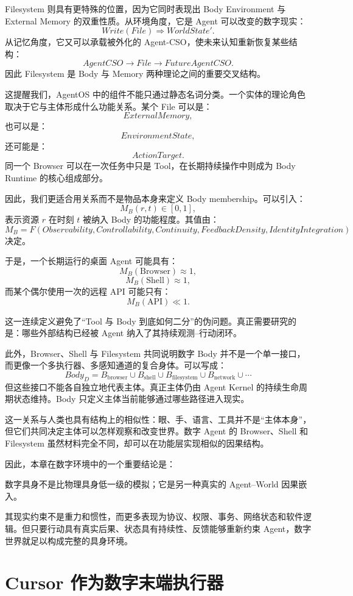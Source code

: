 Filesystem 则具有更特殊的位置，因为它同时表现出 Body Environment 与 External Memory 的双重性质。从环境角度，它是 Agent 可以改变的数字现实：
\[
Write(File)
\Rightarrow
WorldState'.
\]
从记忆角度，它又可以承载被外化的 Agent-CSO，使未来认知重新恢复某些结构：
\[
AgentCSO
\rightarrow
File
\rightarrow
FutureAgentCSO.
\]
因此 Filesystem 是 Body 与 Memory 两种理论之间的重要交叉结构。

这提醒我们，AgentOS 中的组件不能只通过静态名词分类。一个实体的理论角色取决于它与主体形成什么功能关系。某个 File 可以是：
\[
ExternalMemory,
\]
也可以是：
\[
EnvironmentState,
\]
还可能是：
\[
ActionTarget.
\]
同一个 Browser 可以在一次任务中只是 Tool，在长期持续操作中则成为 Body Runtime 的核心组成部分。

因此，我们更适合用关系而不是物品本身来定义 Body membership。可以引入：
\[
M_B(r,t)
\in
[0,1],
\]
表示资源 $r$ 在时刻 $t$ 被纳入 Body 的功能程度。其值由：
\[
M_B
=
F(
Observability,
Controllability,
Continuity,
FeedbackDensity,
IdentityIntegration
)
\]
决定。

于是，一个长期运行的桌面 Agent 可能具有：
\[
M_B(\mathrm{Browser})\approx1,
\]
\[
M_B(\mathrm{Shell})\approx1,
\]
而某个偶尔使用一次的远程 API 可能只有：
\[
M_B(\mathrm{API})\ll1.
\]

这一连续定义避免了“Tool 与 Body 到底如何二分”的伪问题。真正需要研究的是：哪些外部结构已经被 Agent 纳入了其持续观测--行动闭环。

此外，Browser、Shell 与 Filesystem 共同说明数字 Body 并不是一个单一接口，而更像一个多执行器、多感知通道的复合身体。可以写成：
\[
Body_D
=
B_{\mathrm{browser}}
\cup
B_{\mathrm{shell}}
\cup
B_{\mathrm{filesystem}}
\cup
B_{\mathrm{network}}
\cup
\cdots
\]
但这些接口不能各自独立地代表主体。真正主体仍由 Agent Kernel 的持续生命周期状态维持。Body 只定义主体当前能够通过哪些路径进入现实。

这一关系与人类也具有结构上的相似性：眼、手、语言、工具并不是“主体本身”，但它们共同决定主体可以怎样观察和改变世界。数字 Agent 的 Browser、Shell 和 Filesystem 虽然材料完全不同，却可以在功能层实现相似的因果结构。

因此，本章在数字环境中的一个重要结论是：
\begin{conclusion}
数字具身不是比物理具身低一级的模拟；它是另一种真实的 Agent--World 因果嵌入。
\end{conclusion}
其现实约束不是重力和惯性，而更多表现为协议、权限、事务、网络状态和软件逻辑。但只要行动具有真实后果、状态具有持续性、反馈能够重新约束 Agent，数字世界就足以构成完整的具身环境。

\section{Cursor 作为数字末端执行器}

